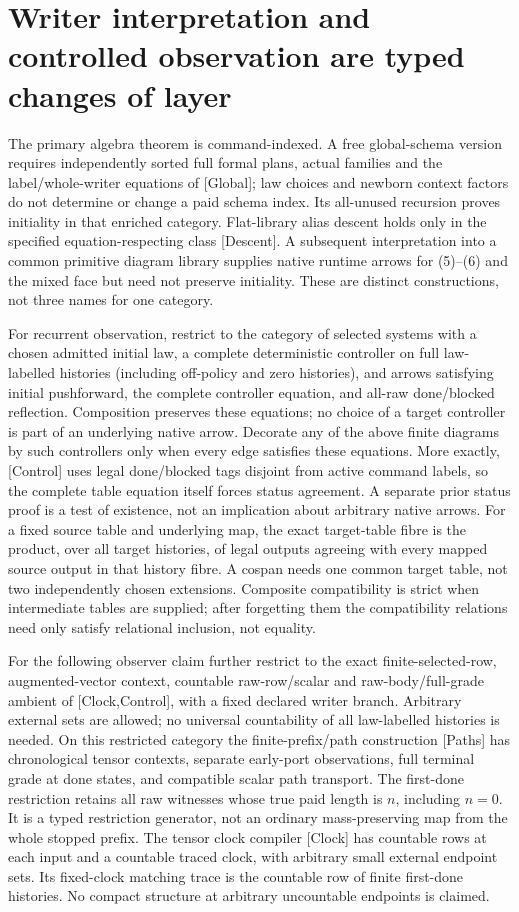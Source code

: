 \documentclass[11pt]{article}
\begin{document}
\section{Writer interpretation and controlled observation are typed changes of layer}
The primary algebra theorem is command-indexed. A free global-schema version requires independently sorted full formal plans, actual families and the label/whole-writer equations of [Global]; law choices and newborn context factors do not determine or change a paid schema index. Its all-unused recursion proves initiality in that enriched category. Flat-library alias descent holds only in the specified equation-respecting class [Descent]. A subsequent interpretation into a common primitive diagram library supplies native runtime arrows for (5)--(6) and the mixed face but need not preserve initiality. These are distinct constructions, not three names for one category.

For recurrent observation, restrict to the category of selected systems with a chosen admitted initial law, a complete deterministic controller on full law-labelled histories (including off-policy and zero histories), and arrows satisfying initial pushforward, the complete controller equation, and all-raw done/blocked reflection. Composition preserves these equations; no choice of a target controller is part of an underlying native arrow. Decorate any of the above finite diagrams by such controllers only when every edge satisfies these equations. More exactly, [Control] uses legal done/blocked tags disjoint from active command labels, so the complete table equation itself forces status agreement. A separate prior status proof is a test of existence, not an implication about arbitrary native arrows. For a fixed source table and underlying map, the exact target-table fibre is the product, over all target histories, of legal outputs agreeing with every mapped source output in that history fibre. A cospan needs one common target table, not two independently chosen extensions. Composite compatibility is strict when intermediate tables are supplied; after forgetting them the compatibility relations need only satisfy relational inclusion, not equality.

For the following observer claim further restrict to the exact finite-selected-row, augmented-vector context, countable raw-row/scalar and raw-body/full-grade ambient of [Clock,Control], with a fixed declared writer branch. Arbitrary external sets are allowed; no universal countability of all law-labelled histories is needed. On this restricted category the finite-prefix/path construction [Paths] has chronological tensor contexts, separate early-port observations, full terminal grade at done states, and compatible scalar path transport. The first-done restriction retains all raw witnesses whose true paid length is $n$, including $n=0$. It is a typed restriction generator, not an ordinary mass-preserving map from the whole stopped prefix. The tensor clock compiler [Clock] has countable rows at each input and a countable traced clock, with arbitrary small external endpoint sets. Its fixed-clock matching trace is the countable row of finite first-done histories. No compact structure at arbitrary uncountable endpoints is claimed.
\end{document}
